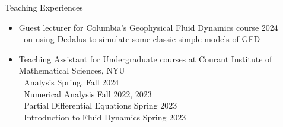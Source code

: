 \documentclass{resume} %
\begin{document}


\begin{rSection}{Teaching Experiences}
\begin{itemize}
    \item Guest lecturer for Columbia's Geophysical Fluid Dynamics course \hfill 2024\\
    $\left.\;\right.$ on using Dedalus to simulate some classic simple models of GFD
    \item Teaching Assistant for Undergraduate courses at Courant Institute of Mathematical Sciences, NYU\\
    $\left.\;\right.$ Analysis \hfill Spring, Fall 2024\\
    $\left.\;\right.$ Numerical Analysis \hfill Fall 2022, 2023\\
    $\left.\;\right.$ Partial Differential Equations \hfill Spring 2023\\
    $\left.\;\right.$ Introduction to Fluid Dynamics \hfill Spring 2023
\end{itemize}

\end{rSection}

\end{document}
